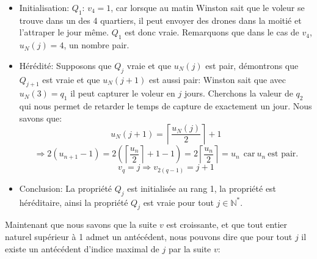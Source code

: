 \hspace{1cm}

\begin{itemize}
    \item Initialisation: $Q_1$: $v_4=1$, car lorsque au matin Winston sait que le voleur se trouve dans un des 4 quartiers, il peut envoyer des drones dans la moitié et l'attraper le jour même. $Q_1$ est donc vraie. Remarquons que dans le cas de $v_4$, $u_N(j)=4$, un nombre pair.
    \item Hérédité: Supposons que $Q_j$ vraie et que $u_N(j)$ est pair, démontrons que $Q_{j+1}$ est vraie et que $u_N(j+1)$ est aussi pair:
    Winston sait que avec $u_N(3)=q_1$ il peut capturer le voleur en $j$ jours. Cherchons la valeur de $q_2$ qui nous permet de retarder le temps de capture de exactement un jour. Nous savons que: $$u_N(j+1)=\left\lceil{\dfrac{u_N(j)}{2}}\right\rceil+1$$
    $$\Rightarrow 2(u_{n+1}-1)=2\left(\left\lceil\dfrac{u_n}{2}\right\rceil+1-1\right)=2\left\lceil\dfrac{u_n}{2}\right\rceil=u_n\:\: \text{car}\: u_n\: \text{est pair.}$$
    $$v_q=j\Rightarrow v_{2(q-1)}=j+1$$
    \item Conclusion: La propriété $Q_j$ est initialisée au rang 1, la propriété est héréditaire, ainsi la propriété $Q_j$ est vraie pour tout $j\in\mathbb{N}^*$.

\end{itemize}

\hspace{1cm}

Maintenant que nous savons que la suite $v$ est croissante, et que tout entier naturel supérieur à 1 admet un antécédent, nous pouvons dire que pour tout $j$ il existe un antécédent d'indice maximal de $j$ par la suite $v$:

